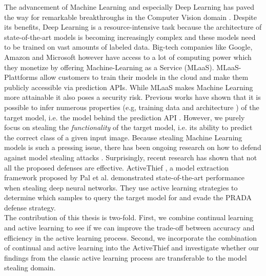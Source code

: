 
\Abstract
The advancement of Machine Learning and especially Deep Learning has paved the way for remarkable breakthroughs in the Computer Vision domain \cite{he2016deep}
 \cite{goodfellow2020generative} \cite{lecun1989backpropagation}. Despite its benefits, Deep Learning is a resource-intensive task because the architecture
  of state-of-the-art models is becoming increasingly complex and these models need to be trained on vast amounts of labeled data. Big-tech companies like Google,
 Amazon and Microsoft however have access to a lot of computing power which they monetize by offering Machine-Learning as a Service (MLaaS). MLaaS-Plattforms
allow customers to train their models in the cloud and make them publicly accessible via prediction APIs. While MLaaS makes Machine Learning more attainable
 it also poses a security risk. Previous works have shown that it is possible to infer numerous properties (e.g, training data \cite{shokri2017membership}
and architecture \cite{oh2019towards}) of the target model, i.e. the model behind the prediction API \cite{tramer2016stealing} \cite{papernot2017practical}.
However, we purely focus on stealing the \textit{functionality} of the target model, i.e. its ability to predict the correct class of a given input image.
Because stealing Machine Learning models is such a pressing issue, there has been ongoing research on how to defend against model stealing attacks
\cite{orekondy2019prediction} \cite{juuti2019prada}. Surprisingly, recent research has shown that not all the proposed defenses are effective.
ActiveThief \cite{pal2020activethief}, a model extraction framework proposed by Pal et al. demonstrated state-of-the-art performance when stealing deep neural
networks. They use active learning strategies to determine which samples to query the target model for and evade the PRADA \cite{juuti2019prada} defense strategy. \\
The contribution of this thesis is two-fold. First, we combine continual learning and active learning to see if we can improve the trade-off between accuracy and 
efficiency in the active learning process. Second, we incorporate the combination of continual and active learning into the ActiveThief and investigate whether our
findings from the classic active learning process are transferable to the model stealing domain.